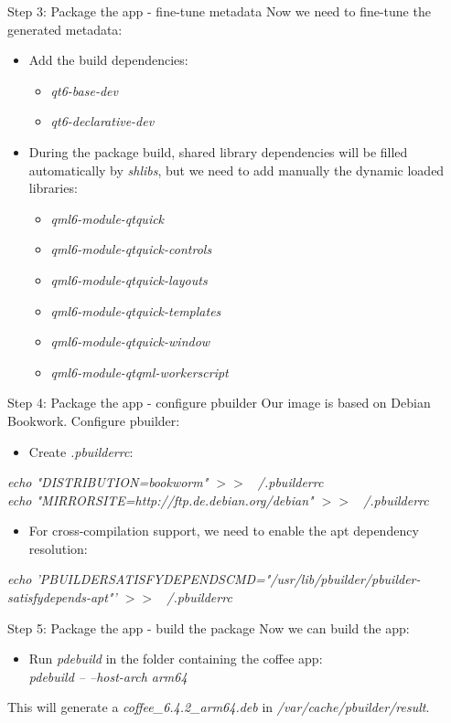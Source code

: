 \documentclass{beamer}
\begin{document}
\begin{frame}{Step 3: Package the app - fine-tune metadata}
	Now we need to fine-tune the generated metadata:
	\begin{itemize}
		\item Add the build dependencies:
		\begin{itemize}
			\item \emph{qt6-base-dev}
			\item \emph{qt6-declarative-dev}
		\end{itemize}
		\item During the package build, shared library dependencies will be filled automatically by \emph{shlibs}, but we need to add manually the dynamic loaded libraries:
		\begin{itemize}
			\item \emph{qml6-module-qtquick}
			\item \emph{qml6-module-qtquick-controls}
			\item \emph{qml6-module-qtquick-layouts}
			\item \emph{qml6-module-qtquick-templates}
			\item \emph{qml6-module-qtquick-window}
			\item \emph{qml6-module-qtqml-workerscript}
		\end{itemize}
	\end{itemize}
\end{frame}

\begin{frame}{Step 4: Package the app - configure pbuilder}
	Our image is based on Debian Bookwork. Configure pbuilder:
	\begin{itemize}
		\item Create \emph{.pbuilderrc}:
	\end{itemize}
	
	\small{\emph{echo "DISTRIBUTION=bookworm" $>>$ ~/.pbuilderrc} \\
	\emph{echo "MIRRORSITE=http://ftp.de.debian.org/debian" $>>$ ~/.pbuilderrc}}
	
	\begin{itemize}
		\item For cross-compilation support, we need to enable the apt dependency resolution:
	\end{itemize}
	\small{\emph{echo 'PBUILDERSATISFYDEPENDSCMD="/usr/lib/pbuilder/pbuilder-satisfydepends-apt"' $>>$ ~/.pbuilderrc}}
\end{frame}

\begin{frame}{Step 5: Package the app - build the package}
	Now we can build the app:
	\begin{itemize}
		\item Run \emph{pdebuild} in the folder containing the coffee app: \\ \emph{pdebuild -- --host-arch arm64}
	\end{itemize}
	This will generate a \emph{coffee\_6.4.2\_arm64.deb} in \emph{/var/cache/pbuilder/result}.
\end{frame}
\end{document}
